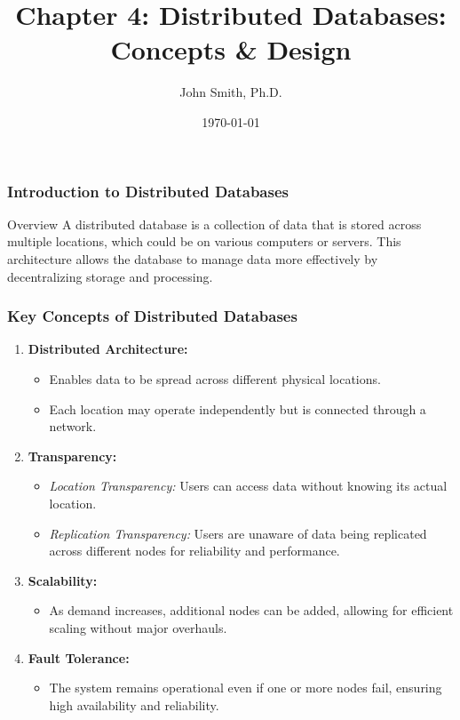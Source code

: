 \documentclass[aspectratio=169]{beamer}
\title[Distributed Databases]{Chapter 4: Distributed Databases: Concepts \& Design}
\author[J. Smith]{John Smith, Ph.D.}
\institute[University Name]{
  Department of Computer Science\\
  University Name\\
  \vspace{0.3cm}
  Email: email@university.edu\\
  Website: www.university.edu
}
\date{\today}
\begin{document}
\frame{\titlepage}

\begin{frame}[fragile]
    \frametitle{Introduction to Distributed Databases}
    \begin{block}{Overview}
        A distributed database is a collection of data that is stored across multiple locations, which could be on various computers or servers. This architecture allows the database to manage data more effectively by decentralizing storage and processing.
    \end{block}
\end{frame}

\begin{frame}[fragile]
    \frametitle{Key Concepts of Distributed Databases}
    \begin{enumerate}
        \item \textbf{Distributed Architecture:}
            \begin{itemize}
                \item Enables data to be spread across different physical locations.
                \item Each location may operate independently but is connected through a network.
            \end{itemize}
        \item \textbf{Transparency:}
            \begin{itemize}
                \item \textit{Location Transparency:} Users can access data without knowing its actual location.
                \item \textit{Replication Transparency:} Users are unaware of data being replicated across different nodes for reliability and performance.
            \end{itemize}
        \item \textbf{Scalability:}
            \begin{itemize}
                \item As demand increases, additional nodes can be added, allowing for efficient scaling without major overhauls.
            \end{itemize}
        \item \textbf{Fault Tolerance:}
            \begin{itemize}
                \item The system remains operational even if one or more nodes fail, ensuring high availability and reliability.
            \end{itemize}
    \end{enumerate}
\end{frame}
\end{document}
